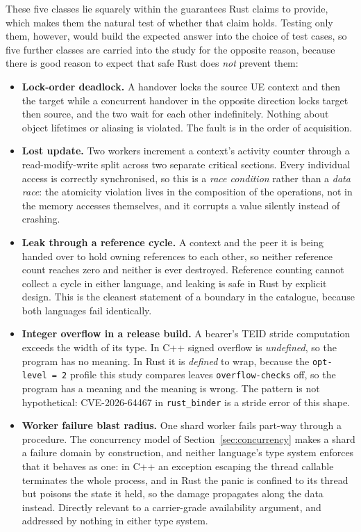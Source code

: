\documentclass[english,twoside,openright,a4paper,censored,csm,software-track-2020]{HYthesisML}
\begin{document}
These five classes lie squarely within the guarantees Rust claims to provide, which makes them
the natural test of whether that claim holds. Testing only them, however, would build the
expected answer into the choice of test cases, so five further classes are carried into the
study for the opposite reason, because there is good reason to expect that safe Rust does
\emph{not} prevent them:

\begin{itemize}
  \item \textbf{Lock-order deadlock.} A handover locks the source UE context and then the
        target while a concurrent handover in the opposite direction locks target then source,
        and the two wait for each other indefinitely. Nothing about object lifetimes or
        aliasing is violated. The fault is in the order of acquisition.
  \item \textbf{Lost update.} Two workers increment a context's activity counter through a
        read-modify-write split across two separate critical sections. Every individual access
        is correctly synchronised, so this is a \emph{race condition} rather than a
        \emph{data race}: the atomicity violation lives in the composition of the operations,
        not in the memory accesses themselves, and it corrupts a value silently instead of
        crashing.
  \item \textbf{Leak through a reference cycle.} A context and the peer it is being handed
        over to hold owning references to each other, so neither reference count reaches zero
        and neither is ever destroyed. Reference counting cannot collect a cycle in either
        language, and leaking is safe in Rust by explicit design. This is the cleanest
        statement of a boundary in the catalogue, because both languages fail identically.
  \item \textbf{Integer overflow in a release build.} A bearer's TEID stride computation
        exceeds the width of its type. In C++ signed overflow is \emph{undefined}, so the
        program has no meaning. In Rust it is \emph{defined} to wrap, because the
        \texttt{opt-level~=~2} profile this study compares leaves \texttt{overflow-checks}
        off, so the program has a meaning and the meaning is wrong. The pattern is not
        hypothetical: CVE-2026-64467 in \texttt{rust\_binder} is a stride error of this shape.
  \item \textbf{Worker failure blast radius.} One shard worker fails part-way through a
        procedure. The concurrency model of Section~\ref{sec:concurrency} makes a shard
        a failure domain by construction, and neither language's type system enforces that it
        behaves as one: in C++ an exception escaping the thread callable terminates the whole
        process, and in Rust the panic is confined to its thread but poisons the state it held,
        so the damage propagates along the data instead. Directly relevant to a carrier-grade
        availability argument, and addressed by nothing in either type system.
\end{itemize}
\end{document}

